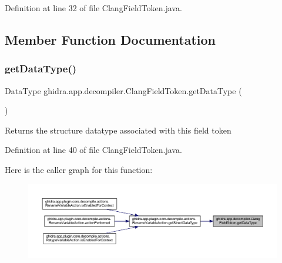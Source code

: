 Definition at line 32 of file Clang\+Field\+Token.\+java.



\subsection{Member Function Documentation}
\mbox{\label{classghidra_1_1app_1_1decompiler_1_1_clang_field_token_a8335688bf1324caa45d8a5efa3863b48}} 
\subsubsection{\texorpdfstring{getDataType()}{getDataType()}}
{\footnotesize\ttfamily Data\+Type ghidra.\+app.\+decompiler.\+Clang\+Field\+Token.\+get\+Data\+Type (\begin{DoxyParamCaption}{ }\end{DoxyParamCaption})\hspace{0.3cm}{\ttfamily [inline]}}

\begin{DoxyReturn}{Returns}
the structure datatype associated with this field token 
\end{DoxyReturn}


Definition at line 40 of file Clang\+Field\+Token.\+java.

Here is the caller graph for this function\+:
\nopagebreak
\begin{figure}[H]
\begin{center}
\leavevmode
\includegraphics[width=350pt]{classghidra_1_1app_1_1decompiler_1_1_clang_field_token_a8335688bf1324caa45d8a5efa3863b48_icgraph}
\end{center}
\end{figure}
\mbox{\label{classghidra_1_1app_1_1decompiler_1_1_clang_field_token_af08d90de7681b0d99d50b8801d4a3b6d}} 
